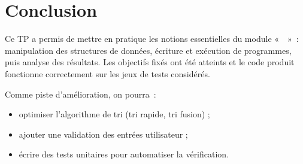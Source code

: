 \chapter*{Conclusion}

Ce TP a permis de mettre en pratique les notions essentielles du module
«~\moduleNom~»~: manipulation des structures de données, écriture et
exécution de programmes, puis analyse des résultats. Les objectifs fixés ont
été atteints et le code produit fonctionne correctement sur les jeux de
tests considérés.

Comme piste d'amélioration, on pourra~:
\begin{itemize}[leftmargin=1.2em,itemsep=1pt]
  \item optimiser l'algorithme de tri (tri rapide, tri fusion) ;
  \item ajouter une validation des entrées utilisateur ;
  \item écrire des tests unitaires pour automatiser la vérification.
\end{itemize}
